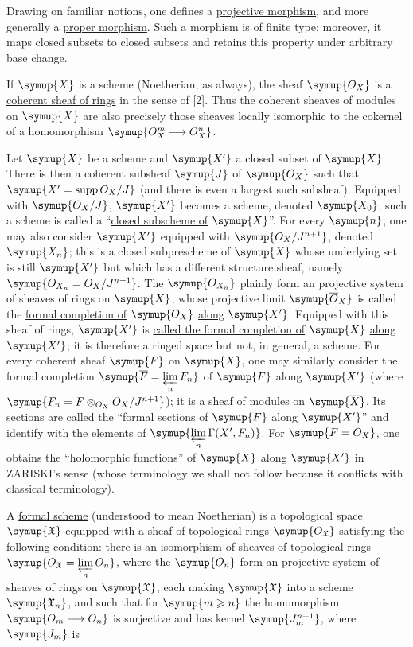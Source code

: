 Drawing on familiar notions, one defines a \uline{projective morphism}, and more
generally a \uline{proper morphism}. Such a morphism is of finite type; moreover,
it maps closed subsets to closed subsets and retains this property under
arbitrary base change.

If $\symup{X}$ is a scheme (Noetherian, as always), the sheaf $\symup{O_X}$ is a
\uline{coherent sheaf of rings} in the sense of [2]. Thus the coherent sheaves
of modules on $\symup{X}$ are also precisely those sheaves locally isomorphic to the
cokernel of a homomorphism $\symup{O_X^{m}\longrightarrow O_X^{n}}$.


Let $\symup{X}$ be a scheme and $\symup{X'}$ a closed subset of $\symup{X}$. There is then a coherent
subsheaf $\symup{J}$ of $\symup{O_X}$ such that
$\symup{X'=\operatorname{supp}O_X/J}$ (and there is even a largest such
subsheaf). Equipped with $\symup{O_X/J}$, $\symup{X'}$ becomes a scheme, denoted $\symup{X_0}$; such
a scheme is called a “\uline{closed subscheme of} $\symup{X}$”. For every $\symup{n}$, one may also
consider $\symup{X'}$ equipped with $\symup{O_X/J^{n+1}}$, denoted $\symup{X_n}$; this is a closed
subprescheme of $\symup{X}$ whose underlying set is still $\symup{X'}$ but which has a
different structure sheaf, namely $\symup{O_{X_n}=O_X/J^{n+1}}$. The
$\symup{O_{X_n}}$ plainly form an projective system of sheaves of rings on $\symup{X}$, whose
projective limit $\symup{\overline{O}_X}$ is called the \uline{formal completion of}
$\symup{O_X}$ \uline{along} $\symup{X'}$. Equipped with this sheaf of rings, $\symup{X'}$ is \uline{called the
formal completion of} $\symup{X}$ \uline{along} $\symup{X'}$; it is therefore a ringed space but
not, in general, a scheme. For every coherent sheaf $\symup{F}$ on $\symup{X}$, one may
similarly consider the formal completion
$\symup{\overline F=\varprojlim\limits_n F_n}$ of $\symup{F}$ along $\symup{X'}$ (where
$\symup{F_n=F\otimes_{O_X}O_X/J^{n+1}}$); it is a sheaf of modules on
$\symup{\overline X}$. Its sections are called the “formal sections of $\symup{F}$ along
$\symup{X'}$” and identify with the elements of
$\symup{\varprojlim\limits_n\Gamma(X',F_n)}$. For $\symup{F=O_X}$, one obtains the “holomorphic
functions” of $\symup{X}$ along $\symup{X'}$ in ZARISKI's sense (whose terminology we shall
not follow because it conflicts with classical terminology).

A \uline{formal scheme} (understood to mean Noetherian) is a topological space
$\symup{\mathfrak X}$ equipped with a sheaf of topological rings
$\symup{O_{\mathfrak X}}$ satisfying the following condition: there is an
isomorphism of sheaves of topological rings
$\symup{O_{\mathfrak X}=\varprojlim\limits_nO_n}$, where the $\symup{O_n}$ form an projective
system of sheaves of rings on $\symup{\mathfrak X}$, each making $\symup{\mathfrak X}$ into a
scheme $\symup{\mathfrak X_n}$, and such that for $\symup{m\geqslant n}$ the homomorphism
$\symup{O_m\longrightarrow O_n}$ is surjective and has kernel $\symup{J_m^{n+1}}$, where
$\symup{J_m}$ is

